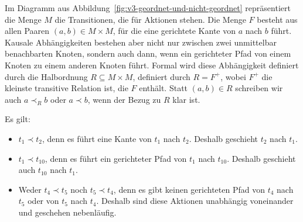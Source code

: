 Im Diagramm 
aus Abbildung~\ref{fig:v3-geordnet-und-nicht-geordnet} repräsentiert die Menge $M$ die Transitionen, die für Aktionen stehen. Die Menge $F$ besteht aus allen Paaren $(a,b) \in M \times M$, für die eine gerichtete Kante von $a$ nach $b$ führt. Kausale Abhängigkeiten bestehen aber nicht nur zwischen zwei unmittelbar benachbarten Knoten, sondern auch dann, wenn ein gerichteter Pfad von einem Knoten zu einem anderen Knoten führt. Formal wird diese Abhängigkeit definiert durch die Halbordnung $R \subseteq M \times M$, definiert durch $R = F^{+}$, wobei $F^{+}$ die kleinste transitive Relation ist, die $F$ enthält. Statt $(a,b) \in R$ schreiben wir auch $a\prec_R b$ oder $a\prec b$, wenn der Bezug zu $R$ klar ist. 

\pagebreak %

Es gilt:
\begin{itemize}
	\item $t_1 \prec t_2$, denn es führt eine Kante von $t_1$ nach $t_2$. Deshalb geschieht $t_2$ nach $t_1$.
	\item $t_1 \prec t_{10}$, denn es führt ein gerichteter Pfad von $t_1$ nach $t_{10}$. Deshalb geschieht auch $t_{10}$ nach $t_1$.
	\item Weder $t_4 \prec t_5$ noch $t_5 \prec t_4$, denn es gibt keinen gerichteten Pfad von $t_4$ nach $t_5$ oder von $t_5$ nach $t_4$. Deshalb sind diese Aktionen unabhängig voneinander und geschehen nebenläufig.
\end{itemize}

\vspace{\baselineskip} %
\vspace{1em} %

